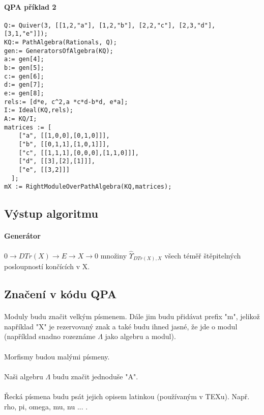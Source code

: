 \documentclass[7pt]{article}
\begin{document}
     \paragraph{QPA příklad 2}
\begin{verbatim}
Q:= Quiver(3, [[1,2,"a"], [1,2,"b"], [2,2,"c"], [2,3,"d"], [3,1,"e"]]);
KQ:= PathAlgebra(Rationals, Q);
gen:= GeneratorsOfAlgebra(KQ);
a:= gen[4];
b:= gen[5];
c:= gen[6];
d:= gen[7];
e:= gen[8];
rels:= [d*e, c^2,a *c*d-b*d, e*a];
I:= Ideal(KQ,rels);
A:= KQ/I;
matrices := [ 
    ["a", [[1,0,0],[0,1,0]]], 
    ["b", [[0,1,1],[1,0,1]]], 
    ["c", [[1,1,1],[0,0,0],[1,1,0]]], 
    ["d", [[3],[2],[1]]], 
    ["e", [[3,2]]] 
  ];
mX := RightModuleOverPathAlgebra(KQ,matrices);
 \end{verbatim}

    \subsection{Výstup algoritmu}
      \paragraph{Generátor} $0\rightarrow DTr(X) \rightarrow E \rightarrow X \rightarrow 0$ 
      množiny $\hat{\Upsilon}_{DTr(X),X}$ všech téměř štěpitelných posloupností končících v X.
    
    
    \subsection{Značení v kódu QPA} 
      \paragraph{} Moduly budu značit velkým písmenem. Dále jim budu přidávat prefix "m", jelikož například "X" je 
      rezervovaný znak a také budu ihned jasné, že jde o modul (například snadno rozeznáme $\Lambda$ jako algebru a modul).
      \paragraph{} Morfismy budou malými písmeny.
      \paragraph{} Naši algebru $\Lambda$ budu značit jednoduše "A".
      \paragraph{} Řecká písmena budu psát jejich opisem latinkou (používaným v 
      TEXu). Např. rho, pi, omega,  mu, nu  ... .
 
\end{document}
